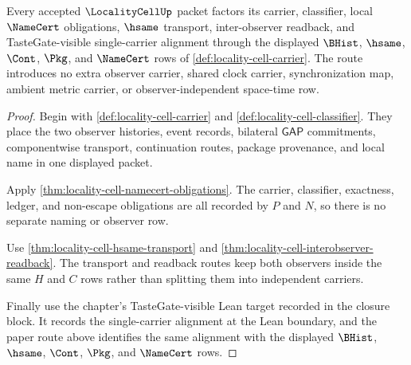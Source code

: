 \begin{theorem}
\label{thm:localitycell-scoped-kernel-route}
Every accepted $\LocalityCellUp$ packet factors its carrier, classifier, local $\NameCert$ obligations, $\hsame$ transport, inter-observer readback, and TasteGate-visible single-carrier alignment through the displayed $\BHist$, $\hsame$, $\Cont$, $\Pkg$, and $\NameCert$ rows of \autoref{def:locality-cell-carrier}. The route introduces no extra observer carrier, shared clock carrier, synchronization map, ambient metric carrier, or observer-independent space-time row.
\end{theorem}
\begin{proof}
Begin with \autoref{def:locality-cell-carrier} and \autoref{def:locality-cell-classifier}. They place the two observer histories, event records, bilateral $\mathsf{GAP}$ commitments, componentwise transport, continuation routes, package provenance, and local name in one displayed packet.

Apply \autoref{thm:locality-cell-namecert-obligations}. The carrier, classifier, exactness, ledger, and non-escape obligations are all recorded by $P$ and $N$, so there is no separate naming or observer row.

Use \autoref{thm:locality-cell-hsame-transport} and \autoref{thm:locality-cell-interobserver-readback}. The transport and readback routes keep both observers inside the same $H$ and $C$ rows rather than splitting them into independent carriers.

Finally use the chapter's TasteGate-visible Lean target recorded in the closure block. It records the single-carrier alignment at the Lean boundary, and the paper route above identifies the same alignment with the displayed $\BHist$, $\hsame$, $\Cont$, $\Pkg$, and $\NameCert$ rows.
\end{proof}

